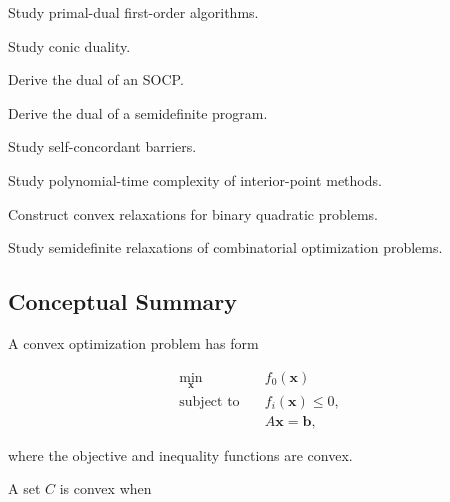 \begin{exercise}[4]
Study primal-dual first-order algorithms.
\end{exercise}

\begin{exercise}[4]
Study conic duality.
\end{exercise}

\begin{exercise}[4]
Derive the dual of an SOCP.
\end{exercise}

\begin{exercise}[4]
Derive the dual of a semidefinite program.
\end{exercise}

\begin{exercise}[4]
Study self-concordant barriers.
\end{exercise}

\begin{exercise}[4]
Study polynomial-time complexity of interior-point methods.
\end{exercise}

\begin{exercise}[4]
Construct convex relaxations for binary quadratic problems.
\end{exercise}

\begin{exercise}[4]
Study semidefinite relaxations of combinatorial optimization problems.
\end{exercise}

\subsection{Conceptual Summary}
\label{subsec:convex-optimization-summary}

A convex optimization problem has form

\[
\boxed{
\begin{aligned}
\min_{\mathbf{x}}
\quad&
f_0(\mathbf{x})
\\
\text{subject to}
\quad&
f_i(\mathbf{x})\leq0,
\\
&
A\mathbf{x}=\mathbf{b},
\end{aligned}
}
\]

where the objective and inequality functions are convex.

A set \(C\) is convex when

